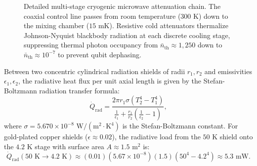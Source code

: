 \begin{figure}[htbp]
    \caption{Detailed multi-stage cryogenic microwave attenuation chain. The coaxial control line passes from room temperature ($300\text{ K}$) down to the mixing chamber ($15\text{ mK}$). Resistive cold attenuators thermalize Johnson-Nyquist blackbody radiation at each discrete cooling stage, suppressing thermal photon occupancy from $\bar{n}_{\text{th}} \approx 1{,}250$ down to $\bar{n}_{\text{th}} \approx 10^{-7}$ to prevent qubit dephasing.}
    \label{fig:detailed_attenuation_chain}
\end{figure}

Between two concentric cylindrical radiation shields of radii $r_1, r_2$ and emissivities $\epsilon_1, \epsilon_2$, the radiative heat flux per unit axial length is given by the Stefan-Boltzmann radiation transfer formula:
\begin{equation}
    \dot{Q}_{\text{rad}} = \frac{2\pi r_1 \sigma \left( T_2^4 - T_1^4 \right)}{\frac{1}{\epsilon_1} + \frac{r_1}{r_2}\left( \frac{1}{\epsilon_2} - 1 \right)},
    \label{eq:stefan_boltzmann_shields}
\end{equation}
where $\sigma = 5.670 \times 10^{-8}\text{ W}/(\text{m}^2\cdot\text{K}^4)$ is the Stefan-Boltzmann constant. For gold-plated copper shields ($\epsilon \approx 0.02$), the radiative load from the $50\text{ K}$ shield onto the $4.2\text{ K}$ stage with surface area $A \approx 1.5\text{ m}^2$ is:
\begin{equation}
    \dot{Q}_{\text{rad}}(50\text{ K} \to 4.2\text{ K}) \approx (0.01)(5.67 \times 10^{-8})(1.5)\left( 50^4 - 4.2^4 \right) \approx 5.3\text{ mW}.
\end{equation}

